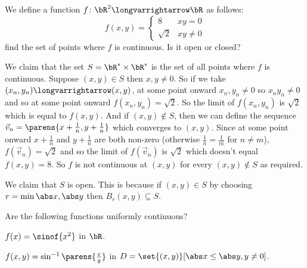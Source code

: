 \documentclass[10pt]{article}
\begin{document}
\begin{exercise*}

    We define a function $f\colon\bR^2\longvarrightarrow\bR$ as follows:
    \[ f(x,y) = \begin{cases} 8 & xy = 0 \\ \sqrt2 & xy\neq0 \end{cases} \]
    find the set of points where $f$ is continuous.
    Is it open or closed?

\end{exercise*}

\begin{blankpp}

    We claim that the set $S=\bR^*\times\bR^*$ is the set of all points where $f$ is continuous.
    Suppose $(x,y)\in S$ then $x,y\neq0$.
    So if we take $(x_n,y_n)\longvarrightarrow(x,y)$, at some point onward $x_n,y_n\neq0$ so $x_ny_n\neq0$ and so at some point onward $f(x_n,y_n)=\sqrt2$.
    So the limit of $f(x_n,y_n)$ is $\sqrt2$ which is equal to $f(x,y)$.
    And if $(x,y)\notin S$, then we can define the sequence $\vec v_n=\parens{x+\frac1n,y+\frac1n}$ which converges to $(x,y)$.
    Since at some point onward $x+\frac1n$ and $y+\frac1n$ are both non-zero (otherwise $\frac1n=\frac1m$ for $n\neq m$), $f(\vec v_n)=\sqrt2$ and so the limit of $f(\vec v_n)$ is $\sqrt2$ which doesn't
    equal $f(x,y)=8$.
    So $f$ is not continuous at $(x,y)$ for every $(x,y)\notin S$ as required.

    We claim that $S$ is open.
    This is because if $(x,y)\in S$ by choosing $r=\min{\abs x,\abs y}$ then $B_r(x,y)\subseteq S$.

\end{blankpp}

\begin{exercise*}

    Are the following functions uniformly continuous?
    \benum
        \item $f(x)=\sinof{x^2}$ in $\bR$.
        \item $f(x,y)=\sin^{-1}\parens{\frac xy}$ in $D=\set{(x,y)}[\abs x\leq\abs y, y\neq0]$.
    \eenum

\end{exercise*}
\end{document}
